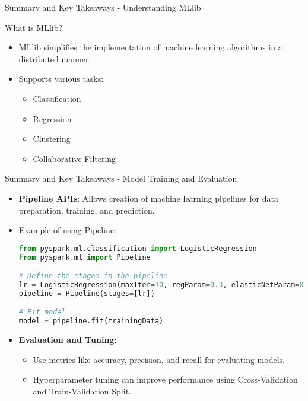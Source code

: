 \documentclass[aspectratio=169]{beamer}
\begin{document}
\begin{frame}[fragile]{Summary and Key Takeaways - Understanding MLlib}
    \begin{block}{What is MLlib?}
        \begin{itemize}
            \item MLlib simplifies the implementation of machine learning algorithms in a distributed manner.
            \item Supports various tasks:
                \begin{itemize}
                    \item Classification
                    \item Regression
                    \item Clustering
                    \item Collaborative Filtering
                \end{itemize}
        \end{itemize}
    \end{block}
\end{frame}

\begin{frame}[fragile]{Summary and Key Takeaways - Model Training and Evaluation}
    \begin{itemize}
        \item \textbf{Pipeline APIs}: Allows creation of machine learning pipelines for data preparation, training, and prediction.
        \item Example of using Pipeline:
        \begin{lstlisting}[language=Python]
from pyspark.ml.classification import LogisticRegression
from pyspark.ml import Pipeline

# Define the stages in the pipeline
lr = LogisticRegression(maxIter=10, regParam=0.3, elasticNetParam=0.8)
pipeline = Pipeline(stages=[lr])

# Fit model
model = pipeline.fit(trainingData)
        \end{lstlisting}
        \item \textbf{Evaluation and Tuning}:
        \begin{itemize}
            \item Use metrics like accuracy, precision, and recall for evaluating models.
            \item Hyperparameter tuning can improve performance using Cross-Validation and Train-Validation Split.
        \end{itemize}
    \end{itemize}
\end{frame}
\end{document}
